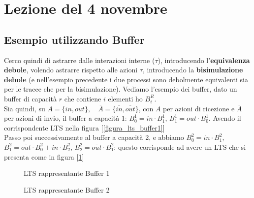 \section{Lezione del 4 novembre}
\subsection{Esempio utilizzando Buffer}
Cerco quindi di astrarre dalle interazioni interne ($\tau$), introducendo l'\textbf{equivalenza debole}, volendo astrarre rispetto alle azioni $\tau$, introducendo la \textbf{bisimulazione debole} (e nell'esempio precedente i due processi sono debolmente equivalenti sia per le tracce che per la bisimulazione).
Vediamo l'esempio dei buffer, dato un buffer di capacità $r$ che contiene $i$ elementi ho $B_i^R$.\\ Sia quindi, su $A=\{in,out\},\quad \overline{A}=\{\overline{in},\overline{out}\}$, con $A$ per azioni di ricezione e $\overline{A}$ per azioni di invio, il buffer a capacità 1: $B_0^1=in\cdot B_1^1$, $B_1^1=\overline{out}\cdot  B_0^1$. Avendo il corrispondente LTS nella figura [\ref{figura_lts_buffer1}] \\
Passo poi successivamente al buffer a capacità 2, e abbiamo $B_0^2=in \cdot B_1^2$, $B_1^2=\overline{out} \cdot B_0^2+in \cdot B_2^2$, $B_2^2=\overline{out}\cdot B_1^2$: questo corrisponde ad avere un LTS che si presenta come in figura [\ref{figura_lts_buffer2}]\\
\begin{figure}[ht]
\centering
    \begin{minipage}[b]{0.3\textwidth}
    \centering
    \caption{LTS rappresentante Buffer 1}
    \label{figura_lts_buffer1}
    \end{minipage}
    \hspace{3cm}%
    \begin{minipage}[b]{0.3\textwidth}
    \centering
    \caption{LTS rappresentante Buffer 2}
    \label{figura_lts_buffer2}
    \end{minipage}
\end{figure}


